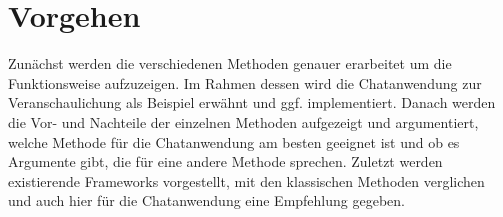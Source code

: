\documentclass[sigplan,screen]{acmart}
\begin{document}
\section{Vorgehen}

Zunächst werden die verschiedenen Methoden genauer erarbeitet um die Funktionsweise aufzuzeigen.
Im Rahmen dessen wird die Chatanwendung zur Veranschaulichung als Beispiel erwähnt und ggf. implementiert.
Danach werden die Vor- und Nachteile der einzelnen Methoden aufgezeigt und argumentiert, welche Methode
für die Chatanwendung am besten geeignet ist und ob es Argumente gibt, die für eine andere Methode sprechen.
Zuletzt werden existierende Frameworks vorgestellt, mit den klassischen Methoden verglichen und auch hier für die Chatanwendung eine Empfehlung gegeben.


% 
% 
% 
\end{document}
